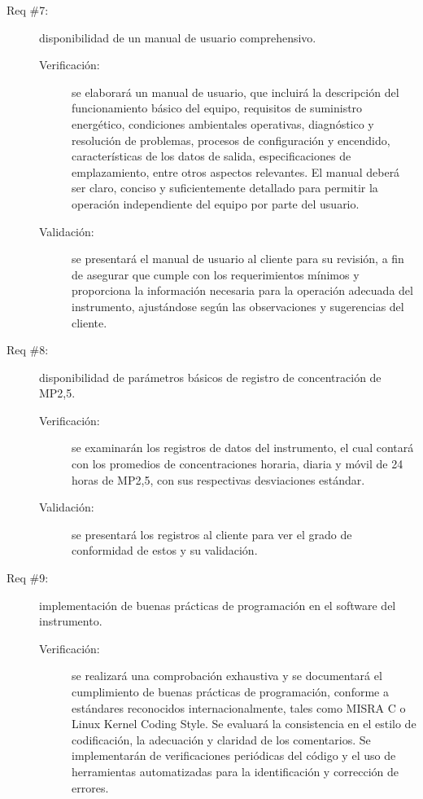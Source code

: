 \begin{description}
	\item [Req \#7:] disponibilidad de un manual de usuario comprehensivo.
	
	\begin{description}
		\item [Verificación:] se elaborará un manual de usuario, que incluirá la descripción del funcionamiento básico del equipo, requisitos de suministro energético, condiciones ambientales operativas, diagnóstico y resolución de problemas, procesos de configuración y encendido, características de los datos de salida, especificaciones de emplazamiento, entre otros aspectos relevantes. El manual deberá ser claro, conciso y suficientemente detallado para permitir la operación independiente del equipo por parte del usuario.
		\item [Validación:] se presentará el manual de usuario al cliente para su revisión, a fin de asegurar que cumple con los requerimientos mínimos y proporciona la información necesaria para la operación adecuada del instrumento, ajustándose según las observaciones y sugerencias del cliente.
	\end{description}
	
	\item [Req \#8:] disponibilidad de parámetros básicos de registro de concentración de MP2,5.
	
	\begin{description}
		\item [Verificación:] se examinarán los registros de datos del instrumento, el cual contará con los promedios de concentraciones horaria, diaria y móvil de 24 horas de MP2,5, con sus respectivas desviaciones estándar.
		
		\item [Validación:] se presentará los registros al cliente para ver el grado de conformidad de estos y su validación.
	\end{description}
	
	\item [Req \#9:] implementación de buenas prácticas de programación en el software del instrumento.
	
	\begin{description}
		\item [Verificación:] se realizará una comprobación exhaustiva y se documentará el cumplimiento de buenas prácticas de programación, conforme a estándares reconocidos internacionalmente, tales como MISRA C o Linux Kernel Coding Style. Se evaluará la consistencia en el estilo de codificación, la adecuación y claridad de los comentarios. Se implementarán de verificaciones periódicas del código y el uso de herramientas automatizadas para la identificación y corrección de errores.
		

\end{description}
\end{description}
